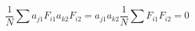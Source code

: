 \begin{equation}
	\frac{1}{N}\sum a_{j1}F_{i1} a_{k2}F_{i2} = a_{j1}a_{k2}\frac{1}{N}\sum F_{i1}F_{i2}=0
\end{equation}
